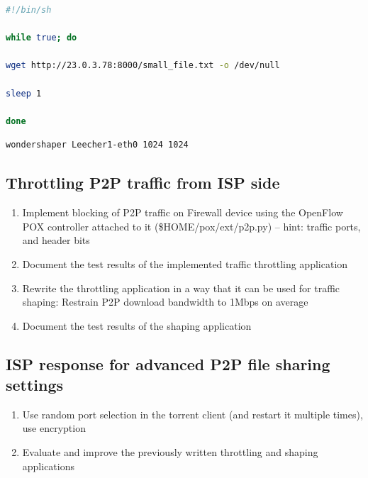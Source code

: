\documentclass[a4paper]{article}
\begin{document}
\begin{enumerate}
          \begin{lstlisting}[language=bash,frame=single,breaklines,caption={Automatic HTTP download script},label=lst:web-requests]
#!/bin/sh

while true; do

wget http://23.0.3.78:8000/small_file.txt -o /dev/null

sleep 1

done 
\end{lstlisting}

          \begin{lstlisting}[language=bash,frame=single,breaklines,caption={Adjusting link capacity},label=lst:wondershaper]
wondershaper Leecher1-eth0 1024 1024 
\end{lstlisting}

\end{enumerate}

\subsection{Throttling P2P traffic from ISP side}
\begin{enumerate}
    \item Implement blocking of P2P traffic on Firewall device using the OpenFlow POX controller attached to it
          (\$HOME/pox/ext/p2p.py) -- hint: traffic ports, and header bits
    \item Document the test results of the implemented traffic throttling application
    \item Rewrite the throttling application in a way that it can be used for traffic shaping: Restrain P2P
          download bandwidth to 1Mbps on average
    \item Document the test results of the shaping application
\end{enumerate}

\subsection{ISP response for advanced P2P file sharing settings}

\begin{enumerate}
    \item Use random port selection in the torrent client (and restart it multiple times), use encryption
    \item Evaluate and improve the previously written throttling and shaping applications
\end{enumerate}
\end{document}
